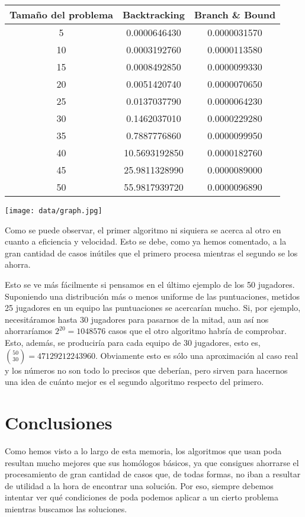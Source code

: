 \documentclass[a4paper, 11pt]{article}
\begin{document}
\begin{center}
\begin{tabular}{|c|c|c|}

\hline
Tamaño del problema & Backtracking & Branch \& Bound \\
\hline
\hline
5 & 0.0000646430 & 0.0000031570 \\
\hline
10 & 0.0003192760 & 0.0000113580 \\
\hline
15 & 0.0008492850 & 0.0000099330 \\
\hline
20 & 0.0051420740 & 0.0000070650 \\
\hline
25 & 0.0137037790 & 0.0000064230 \\
\hline
30 & 0.1462037010 & 0.0000229280 \\
\hline
35 & 0.7887776860 & 0.0000099950 \\
\hline
40 & 10.5693192850 & 0.0000182760 \\
\hline
45 & 25.9811328990 & 0.0000089000 \\
\hline
50 & 55.9817939720 & 0.0000096890 \\
\hline
\end{tabular}
\end{center}

\texttt{[image: data/graph.jpg]}

Como se puede observar, el primer algoritmo ni siquiera se acerca al otro en cuanto
a eficiencia y velocidad. Esto se debe, como ya hemos comentado, a la gran cantidad
de casos inútiles que el primero procesa mientras el segundo se los ahorra.

Esto se ve más fácilmente si pensamos en el último ejemplo de los 50 jugadores.
Suponiendo una distribución más o menos uniforme de las puntuaciones, metidos 25 jugadores
en un equipo las puntuaciones se acercarían mucho. Si, por ejemplo, necesitáramos hasta
30 jugadores para pasarnos de la mitad, aun así nos ahorraríamos $2^{20} = 1048576$ casos
que el otro algoritmo habría de comprobar. Esto, además, se produciría para cada
equipo de 30 jugadores, esto es, ${50 \choose 30} = 47129212243960$. Obviamente esto es 
sólo una aproximación al caso real y los números no son todo lo precisos que deberían,
pero sirven para hacernos una idea de cuánto mejor es el segundo algoritmo respecto del
primero.

\section{Conclusiones}

Como hemos visto a lo largo de esta memoria, los algoritmos que usan poda resultan
mucho mejores que sus homólogos básicos, ya que consigues ahorrarse el procesamiento
de gran cantidad de casos que, de todas formas, no iban a resultar de utilidad a la hora
de encontrar una solución. Por eso, siempre debemos intentar ver qué condiciones de poda
podemos aplicar a un cierto problema mientras buscamos las soluciones.
\end{document}
